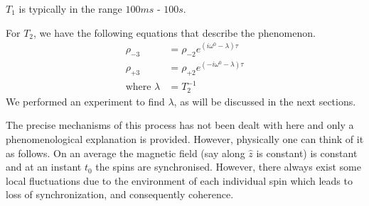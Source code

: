 			$T_1$ is typically in the range $100 ms$ - $100 s$.

			For $T_2$, we have the following equations that describe the phenomenon.
			\begin{align}
				\rho_{-3} &= \rho_{-2} e^{(i\omega^0 - \lambda)\tau} \\
				\rho_{+3} &= \rho_{+2} e^{(-i\omega^0 - \lambda)\tau}\\
				\text{where } \lambda &= T_2^{-1}
			\end{align}
			We performed an experiment to find $\lambda$, as will be discussed in the next sections.

			The precise mechanisms of this process has not been dealt with here and only a phenomenological explanation is provided. However, physically one can think of it as follows. On an average the magnetic field (say along $\hat z$ is constant) is constant and at an instant $t_0$ the spins are synchronised. However, there always exist some local fluctuations due to the environment of each individual spin which leads to loss of synchronization, and consequently coherence.

